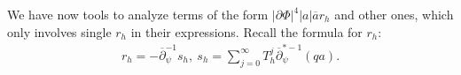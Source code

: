 \documentclass[12pt]{amsart}
\def\p{\partial}
\theoremstyle{definition}
\theoremstyle{remark}
\newcommand{\abs}[1]{\lvert #1 \rvert}
\newcommand{\op}{\overline \p}
\begin{document}
We have now tools to analyze terms of the form $\abs{\p \Phi}^4\abs{a}\overline a r_h$ and other ones, which only involves single $r_h$ in their expressions. Recall the formula for $r_h$:
\begin{eqnarray}
\label{eq: formula of rh}
 r_h=-  \overline{\p}_\psi^{-1}s_h,\ s_h =\sum_{j=0}^\infty T_h^j\op_\psi^{*-1}(qa).
\end{eqnarray}

\end{document}
